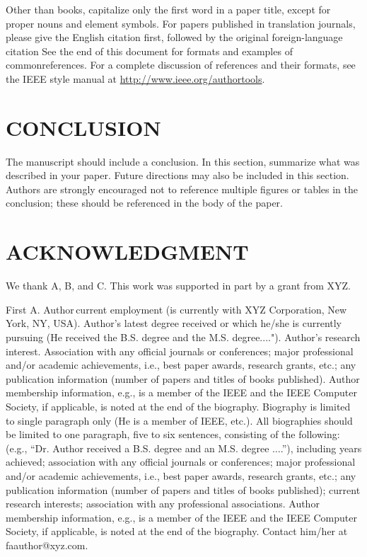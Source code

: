 \documentclass{IEEEcsmag}
\begin{document}
Other than books, capitalize only the first word in a paper title, except 
for proper nouns and element symbols. For papers published in translation 
journals, please give the English citation first, followed by the original 
foreign-language citation See the end of this document for formats and 
examples of common\break references. For a complete discussion of references and 
their formats, see the IEEE style manual at
\url{http://www.ieee.org/authortools}.

\section{CONCLUSION}

The manuscript should include a conclusion. In this section, summarize what was described in your paper. Future directions may also be included in this section. Authors are strongly encouraged not to reference multiple figures or tables in the conclusion; these should be referenced in the body of the paper.

\section{ACKNOWLEDGMENT}

We thank A, B, and C. This work was supported in part by a grant from XYZ.






\begin{IEEEbiography}{First A. Author}{\,}current employment (is
currently with XYZ Corporation, New York, NY, USA). Author's latest degree received or which he/she is currently pursuing (He received the B.S. degree and the M.S. degree...."). Author's research interest. Association with any official journals or conferences; major professional and/or academic achievements, i.e., best paper awards, research grants, etc.; any publication information (number of papers and titles of books published). Author membership information, e.g., is a member of the IEEE and the IEEE Computer Society, if applicable, is noted at the end of the biography. Biography is limited to single paragraph only (He is a member of IEEE, etc.). All biographies should be limited to one paragraph, five to six sentences, consisting of the following: (e.g., ``Dr. Author received a B.S. degree and an M.S. degree $\ldots$.''), including years achieved; association with any official journals or conferences; major professional and/or academic achievements, i.e., best paper awards, research grants, etc.; any publication information (number of papers and titles of books published); current research interests; association with any professional associations. Author membership information, e.g., is a member of the IEEE and the IEEE Computer Society, if applicable, is noted at the end of the biography. Contact him/her at faauthor@xyz.com.
\end{IEEEbiography}
\end{document}
